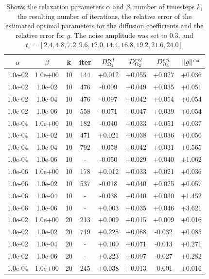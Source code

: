 \documentclass[12pt,a4paper]{article}
\begin{document}
\begin{table}[t]
\centering
\caption{Shows the relaxation parameters $\alpha$ and $\beta$, number of timesteps $k$, the resulting number of iterations, the relative error of the estimated optimal parameters for the diffusion coefficients and the relative error for $g$. The noise amplitude was set to 0.3, and $t_i =[2.4, 4.8, 7.2, 9.6, 12.0, 14.4, 16.8, 19.2, 21.6, 24.0]$  }
\begin{tabular}{*{8}c}
$\alpha$ & $\beta$ & k  & iter & $ D_{\Omega_1}\sp{rel}$ & $D_{\Omega_2}\sp{rel} $ & $D_{\Omega_3}\sp{rel} $ & $|| g ||\sp{rel} $ \\
\hline
 1.0e-02 	 & 1.0e+00 	 & 10 & 144 	 & +0.012 & +0.055 & +0.027 & +0.036 \\ 
 1.0e-02 	 & 1.0e-02 	 & 10 & 476 	 & -0.009 & +0.049 & +0.035 & +0.051 \\ 
 1.0e-02 	 & 1.0e-04 	 & 10 & 476 	 & -0.097 & +0.042 & +0.054 & +0.054 \\ 
 1.0e-02 	 & 1.0e-06 	 & 10 & 558 	 & -0.071 & +0.047 & +0.039 & +0.054 \\ 
 1.0e-04 	 & 1.0e+00 	 & 10 & 182 	 & -0.040 & +0.033 & +0.051 & +0.037 \\ 
 1.0e-04 	 & 1.0e-02 	 & 10 & 471 	 & +0.021 & +0.038 & +0.036 & +0.056 \\ 
 1.0e-04 	 & 1.0e-04 	 & 10 & 792 	 & -0.058 & +0.042 & +0.031 & +0.565 \\ 
 1.0e-04 	 & 1.0e-06 	 & 10 &  -   & -0.050 & +0.029 & +0.040 & +1.062 \\ 
 1.0e-06 	 & 1.0e+00 	 & 10 & 178 	 & +0.012 & +0.033 & +0.021 & +0.036 \\ 
 1.0e-06 	 & 1.0e-02 	 & 10 & 537 	 & -0.018 & +0.040 & +0.025 & +0.057 \\ 
 1.0e-06 	 & 1.0e-04 	 & 10 &  -	 & -0.038 & +0.040 & +0.030 & +1.452 \\ 
 1.0e-06 	 & 1.0e-06 	 & 10 &  - 	 & +0.003 & +0.035 & +0.046 & +3.621 \\ 
 1.0e-02 	 & 1.0e+00 	 & 20 & 213 	 & +0.009 & +0.015 & +0.009 & +0.016 \\ 
 1.0e-02 	 & 1.0e-02 	 & 20 & 719 	 & +0.228 & +0.088 & -0.032 & +0.085 \\ 
 1.0e-02 	 & 1.0e-04 	 & 20 &  -   & +0.100 & +0.071 & -0.013 & +0.271 \\ 
 1.0e-02 	 & 1.0e-06 	 & 20 &   -  & +0.223 & +0.097 & -0.027 & +0.282 \\ 
 1.0e-04 	 & 1.0e+00 	 & 20 & 245 	 & +0.038 & +0.013 & -0.001 & +0.016 \\ 

\end{tabular}
\end{table}
\end{document}

